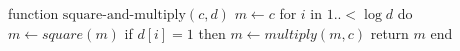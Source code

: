 \documentclass[margin={0 0 39mm 0}]{standalone}
\begin{document}
\begin{Pseudocode}[frame=single]
function $\text{square-and-multiply}(c, d)$
  $m \gets c$
  for $i$ in $1 ..{<} \log d$ do
    $m \gets square(m)$
    if $d[i] = 1$ then
      $m \gets multiply(m, c)$
  return $m$
end
\end{Pseudocode}
\end{document}
